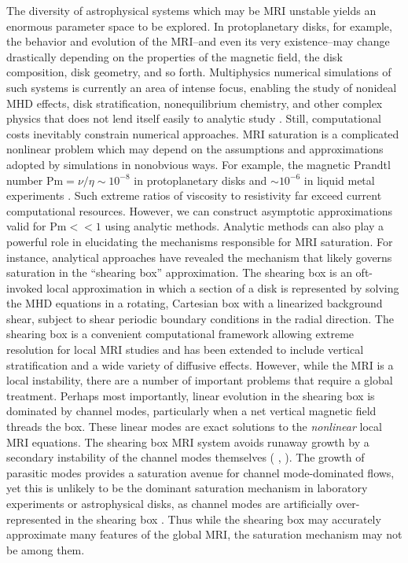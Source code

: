\documentclass{emulateapj}
\newcommand{\citei}[1]{\citeauthor{#1} \citeyear{#1}}
\newcommand{\Pm}{\mathrm{Pm}}
\begin{document}
The diversity of astrophysical systems which may be MRI unstable yields an enormous parameter space to be explored. In protoplanetary disks, for example, the behavior and evolution of the MRI--and even its very existence--may change drastically depending on the properties of the magnetic field, the disk composition, disk geometry, and so forth. Multiphysics numerical simulations of such systems is currently an area of intense focus, enabling the study of nonideal MHD effects, disk stratification, nonequilibrium chemistry, and other complex physics that does not lend itself easily to analytic study \citep[e.g.][among many others]{Fleming:2003fs,Bai:2011cm, Flock:2013,Suzuki:2014vh}. Still, computational costs inevitably constrain numerical approaches. MRI saturation is a complicated nonlinear problem which may depend on the assumptions and approximations adopted by simulations in nonobvious ways. For example, the magnetic Prandtl number $\Pm = \nu/\eta \sim 10^{-8}$ in protoplanetary disks \citet[e.g.][]{OishiMacLow:2011} and $\sim 10^{-6}$ in liquid metal experiments \citep[e.g.][]{Goodman:2002ix}. Such extreme ratios of viscosity to resistivity far exceed current computational resources. However, we can construct asymptotic approximations valid for $\Pm << 1$ using analytic methods. Analytic methods can also play a powerful role in elucidating the mechanisms responsible for MRI saturation. For instance, analytical approaches have revealed the mechanism that likely governs saturation in the ``shearing box'' approximation. The shearing box is an oft-invoked local approximation in which a section of a disk is represented by solving the MHD equations in a rotating, Cartesian box with a linearized background shear, subject to shear periodic boundary conditions in the radial direction. The shearing box is a convenient computational framework allowing extreme resolution for local MRI studies and has been extended to include vertical stratification and a wide variety of diffusive effects. However, while the MRI is a local instability, there are a number of important problems that require a global treatment. Perhaps most importantly, linear evolution in the shearing box is dominated by channel modes, particularly when a net vertical magnetic field threads the box. These linear modes are exact solutions to the \textit{nonlinear} local MRI equations. The shearing box MRI system avoids runaway growth by a secondary instability of the channel modes themselves (\citei{Goodman:1994ul}, \citei{Pessah:2010ic}). The growth of parasitic modes provides a saturation avenue for channel mode-dominated flows, yet this is unlikely to be the dominant saturation mechanism in laboratory experiments or astrophysical disks, as channel modes are artificially over-represented in the shearing box \citep{Latter:2015}. Thus while the shearing box may accurately approximate many features of the global MRI, the saturation mechanism may not be among them. 
\end{document}

